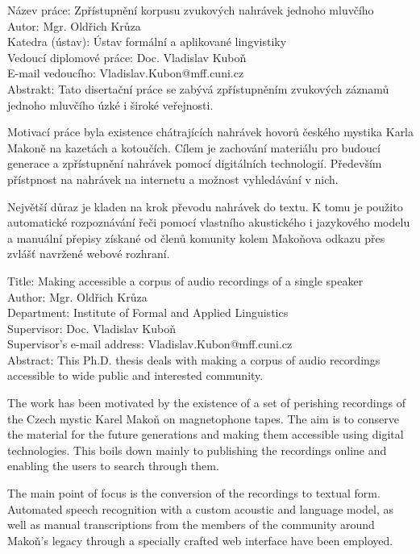 \noindent Název práce: Zpřístupnění korpusu zvukových nahrávek jednoho mluvčího\\
Autor: Mgr. Oldřich Krůza\\
Katedra (ústav): Ústav formální a aplikované lingvistiky\\
Vedoucí diplomové práce: Doc. Vladislav Kuboň\\
E-mail vedoucího: Vladislav.Kubon@mff.cuni.cz\\

\noindent Abstrakt:  Tato disertační práce se zabývá zpřístupněním zvukových
záznamů jednoho mluvčího úzké i široké veřejnosti.

Motivací práce byla existence chátrajících nahrávek hovorů českého mystika
Karla Makoně na kazetách a kotoučích. Cílem je zachování materiálu pro
budoucí generace a zpřístupnění nahrávek pomocí digitálních technologií.
Především přístpnost na nahrávek na internetu a možnost vyhledávání v nich.

Největší důraz je kladen na krok převodu nahrávek do textu. K tomu je použito
automatické rozpoznávání řeči pomocí vlastního akustického i jazykového modelu
a manuální přepisy získané od členů komunity kolem Makoňova odkazu přes zvlášť
navržené webové rozhraní.

\vspace{10mm}

\noindent
Title: Making accessible a corpus of audio recordings of a single speaker\\
Author: Mgr. Oldřich Krůza\\
Department: Institute of Formal and Applied Linguistics\\
Supervisor: Doc. Vladislav Kuboň\\
Supervisor's e-mail address: Vladislav.Kubon@mff.cuni.cz\\

\noindent Abstract:  This Ph.D. thesis deals with making a corpus of audio
recordings accessible to wide public and interested community.

The work has been motivated by the existence of a set of perishing recordings
of the Czech mystic Karel Makoň on magnetophone tapes. The aim is to conserve
the material for the future generations and making them accessible using
digital technologies. This boils down mainly to publishing the recordings online
and enabling the users to search through them.

The main point of focus is the conversion of the recordings to textual form.
Automated speech recognition with a custom acoustic and language model, as well
as manual transcriptions from the members of the community around Makoň's legacy
through a specially crafted web interface have been employed.
